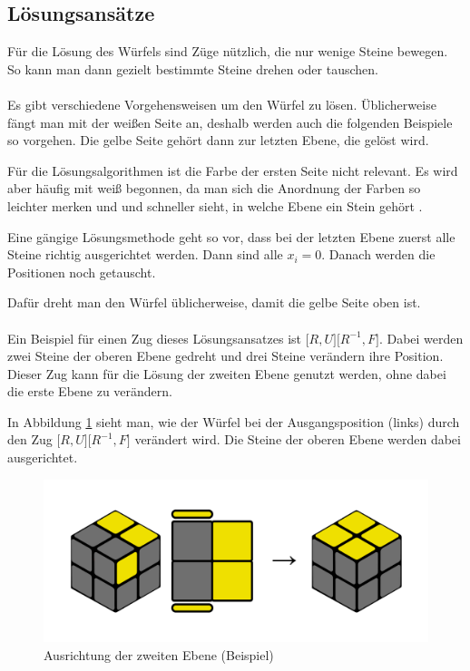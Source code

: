 \documentclass[12pt,a4paper, usenames, dvipsnames]{article}
\begin{document}
\subsection*{Lösungsansätze}
Für die Lösung des Würfels sind Züge nützlich, die nur wenige Steine bewegen. So kann man dann gezielt bestimmte Steine drehen oder tauschen. 
\\
\\
Es gibt verschiedene Vorgehensweisen um den Würfel zu lösen. Üblicherweise fängt man mit der weißen Seite an, deshalb werden auch die folgenden Beispiele so vorgehen. Die gelbe Seite gehört dann zur letzten Ebene, die gelöst wird. 

Für die Lösungsalgorithmen ist die Farbe der ersten Seite nicht relevant. Es wird aber häufig mit weiß begonnen, da man sich die Anordnung der Farben so leichter merken und und schneller sieht, in welche Ebene ein Stein gehört \cite{RF}. 

Eine gängige Lösungsmethode geht so vor, dass bei der letzten Ebene zuerst alle Steine richtig ausgerichtet werden. Dann sind alle $x_i=0$. Danach werden die Positionen noch getauscht. 

Dafür dreht man den Würfel üblicherweise, damit die gelbe Seite oben ist. \\
\\
Ein Beispiel für einen Zug dieses Lösungsansatzes ist $\lbrack R, U \rbrack \lbrack R^{-1}, F \rbrack$. Dabei werden zwei Steine der oberen Ebene gedreht und drei Steine verändern ihre Position. Dieser Zug kann für die Lösung der zweiten Ebene genutzt werden, ohne dabei die erste Ebene zu verändern. \cite{RF2} 

In Abbildung \ref{25} sieht man, wie der Würfel bei der Ausgangsposition (links) durch den Zug $\lbrack R, U \rbrack \lbrack R^{-1}, F \rbrack$ verändert wird. Die Steine der oberen Ebene werden dabei ausgerichtet.

\begin{figure}[h]
\centering
\includegraphics[scale=0.12]{isiakanm.png}
\caption{Ausrichtung der zweiten Ebene (Beispiel)}
\label{25}
\end{figure}
\end{document}
